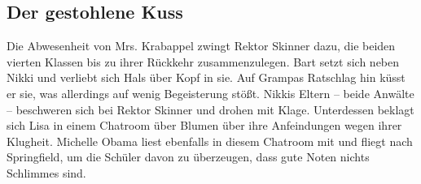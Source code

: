 
\subsection{Der gestohlene Kuss}
Die Abwesenheit von Mrs. Krabappel zwingt Rektor Skinner dazu, die beiden vierten Klassen bis zu ihrer Rückkehr zusammenzulegen. Bart setzt sich neben Nikki und verliebt sich Hals über Kopf in sie. Auf Grampas Ratschlag hin küsst er sie, was allerdings auf wenig Begeisterung stößt. Nikkis Eltern -- beide Anwälte -- beschweren sich bei Rektor Skinner und drohen mit Klage. Unterdessen beklagt sich Lisa in einem Chatroom über Blumen über ihre Anfeindungen wegen ihrer Klugheit. Michelle Obama liest ebenfalls in diesem Chatroom mit und fliegt nach Springfield, um die Schüler davon zu überzeugen, dass gute Noten nichts Schlimmes sind. 




